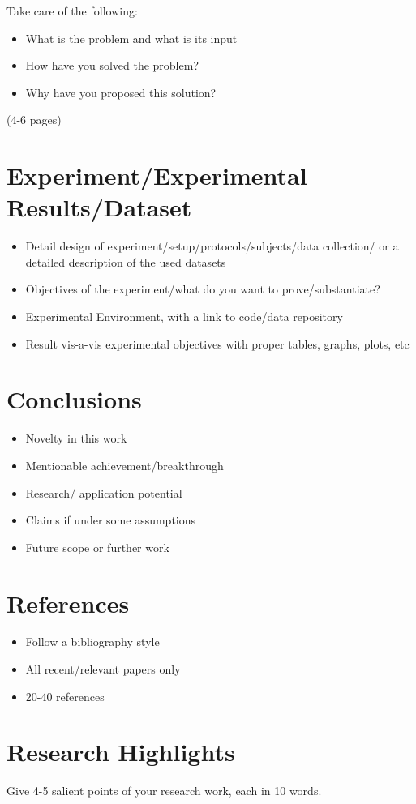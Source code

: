 \documentclass{article}
\begin{document}
Take care of the following:
\begin{itemize}
    \item What is the problem and what is its input
    \item How have you solved the problem?
    \item Why have you proposed this solution?
\end{itemize}
(4-6 pages)\\
\hline

\section{Experiment/Experimental Results/Dataset}
\begin{itemize}
    \item Detail design of experiment/setup/protocols/subjects/data collection/ or a detailed description of the used datasets
    \item Objectives of the experiment/what do you want to prove/substantiate?
    \item Experimental Environment, with a link to code/data repository
    \item Result vis-a-vis experimental objectives with proper tables, graphs, plots, etc
\end{itemize}
\hline

\section{Conclusions}
\begin{itemize}
    \item Novelty in this work
    \item Mentionable achievement/breakthrough
    \item Research/ application potential
    \item Claims if under some assumptions
    \item Future scope or further work
\end{itemize}
\hline

\section{References}
\begin{itemize}
    \item Follow a bibliography style
    \item All recent/relevant papers only
    \item 20-40 references
\end{itemize}
\hline

\section{Research Highlights}
Give 4-5 salient points of your research work, each in 10 words.
\end{document}
